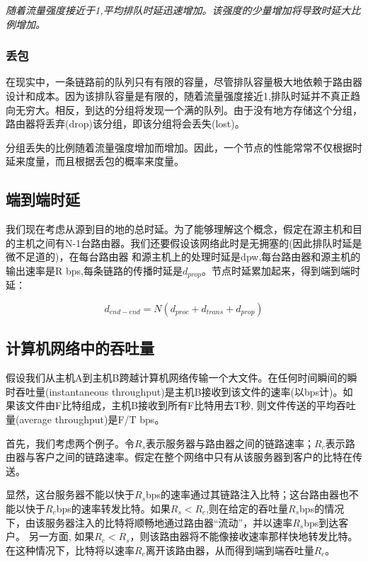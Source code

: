     \emph{随着流量强度接近于1,平均排队时延迅速增加。该强度的少量增加将导致时延大比例增加。}

\subsubsection{丢包}

    在现实中，一条链路前的队列只有有限的容量，尽管排队容量极大地依赖于路由器设计和成本。因为该排队容量是有限的，随着流量强度接近1,排队时延并不真正趋向无穷大。相反，到达的分组将发现一个满的队列。由于没有地方存储这个分组，路由器将丢弃(drop)该分组，即该分组将会丢失(lost)。

    分组丢失的比例随着流量强度增加而增加。因此，一个节点的性能常常不仅根据时延来度量，而且根据丢包的概率来度量。

\subsection{端到端时延}

    我们现在考虑从源到目的地的总时延。为了能够理解这个概念，假定在源主机和目的主机之间有N-1台路由器。我们还要假设该网络此时是无拥塞的(因此排队时延是微不足道的)，在每台路由器 和源主机上的处理时延是dpw,每台路由器和源主机的输出速率是R bps,每条链路的传播时延是$d_{prop}$。节点时延累加起来，得到端到端时延：

$$
    d_{end-end} = N(d_{proc} + d_{trans} + d_{prop})
$$

\subsection{计算机网络中的吞吐量}

    假设我们从主机A到主机B跨越计算机网络传输一个大文件。在任何时间瞬间的瞬时吞吐量(instantaneous throughput)是主机B接收到该文件的速率(以bps计)。如果该文件由F比特组成，主机B接收到所有F比特用去T秒, 则文件传送的平均吞吐量(average throughput)是F/T bps。

    首先，我们考虑两个例子。令$R_{s}$表示服务器与路由器之间的链路速率；$R_{c}$表示路由器与客户之间的链路速率。假定在整个网络中只有从该服务器到客户的比特在传送。

    显然，这台服务器不能以快于$R_{s}$bps的速率通过其链路注入比特；这台路由器也不能以快于$R_{c}$bps的速率转发比特。如果$R_s < R_c$,则在给定的吞吐量$R_s$bps的情况下，由该服务器注入的比特将顺畅地通过路由器“流动”，并以速率$R_s$bps到达客户。 另一方面, 如果$R_c < R_s$，则该路由器将不能像接收速率那样快地转发比特。在这种情况下，比特将以速率$R_c$离开该路由器，从而得到端到端吞吐量$R_c$。

